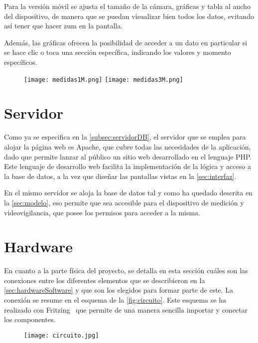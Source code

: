 Para la versión móvil se ajusta el tamaño de la cámara, gráficas y tabla al ancho del dispositivo, de manera que se puedan visualizar bien todos los datos, evitando así tener que hacer zum en la pantalla.
\pagebreak

Además, las gráficas ofrecen la posibilidad de acceder a un dato en particular si se hace clic o toca una sección específica, indicando los valores y momento específicos.
\begin{figure}[H]
	{\texttt{[image: medidas1M.png]}
		\texttt{[image: medidas3M.png]}}
\end{figure}

\section{Servidor}\label{sec:servidor}
Como ya se especifica en la \autoref{subsec:servidorDB}, el servidor que se emplea para alojar la página web es Apache, que cubre todas las necesidades de la aplicación, dado que permite lanzar al público un sitio web desarrollado en el lenguaje PHP. Este lenguaje de desarrollo web facilita la implementación de la lógica y acceso a la base de datos, a la vez que diseñar las pantallas vistas en la \autoref{sec:interfaz}. 

En el mismo servidor se aloja la base de datos tal y como ha quedado descrita en la \autoref{sec:modelo}, eso permite que sea accesible para el dispositivo de medición y videovigilancia, que posee los permisos para acceder a la misma.
\pagebreak

\section{Hardware}\label{sec:hardware}
En cuanto a la parte física del proyecto, se detalla en esta sección cuáles son las conexiones entre los diferentes elementos que se describieron en la \autoref{sec:hardwareSoftware} y que son los elegidos para formar parte de este. La conexión se resume en el esquema de la \autoref{fig:circuito}. Este esquema se ha realizado con Fritzing~\cite{fritzing_fritzing_nodate} que permite de una manera sencilla importar y conectar los componentes.
\begin{figure}[H]
	{\texttt{[image: circuito.jpg]}}
\end{figure}


